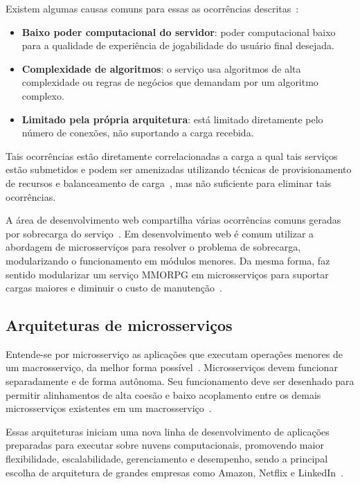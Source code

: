 Existem algumas causas comuns para essas as ocorrências descritas~\cite{1417630}:

\begin{itemize}
  \item \textbf{Baixo poder computacional do servidor}: poder computacional baixo para a qualidade de experiência de jogabilidade do usuário final desejada.
  \item \textbf{Complexidade de algoritmos}: o serviço usa algoritmos de alta complexidade ou regras de negócios que demandam por um algoritmo complexo.
  \item \textbf{Limitado pela própria arquitetura}: está limitado diretamente pelo número de conexões, não suportando a carga recebida.
\end{itemize}

Tais ocorrências estão diretamente correlacionadas a carga a qual tais serviços estão submetidos e podem ser amenizadas utilizando técnicas de provisionamento de recursos e balanceamento de carga~\cite{1417630}, mas não suficiente para eliminar tais ocorrências.

A área de desenvolvimento web compartilha várias ocorrências comuns geradas por sobrecarga do serviço~\cite{7830692}.
%
Em desenvolvimento web é comum utilizar a abordagem de microsserviços para resolver o problema de sobrecarga, modularizando o  funcionamento em módulos menores.
%
Da mesma forma, faz sentido modularizar um serviço \ac{MMORPG} em microsserviços para suportar cargas maiores e diminuir o custo de manutenção~\cite{7515686}.

\subsection{Arquiteturas de microsserviços}

Entende-se por microsserviço as aplicações que executam operações menores de um macrosserviço, da melhor forma possível~\cite{stephenclarkewillson2017}.
%
Microsserviços devem funcionar separadamente e de forma autônoma.
%
Seu funcionamento deve ser desenhado para permitir alinhamentos de alta coesão e baixo acoplamento entre os demais microsserviços existentes em um macrosserviço~\cite{8169955}.



Essas arquiteturas iniciam uma nova linha de desenvolvimento de aplicações preparadas para executar sobre nuvens computacionais, promovendo maior flexibilidade, escalabilidade, gerenciamento e desempenho, sendo a principal escolha de arquitetura de grandes empresas como Amazon, Netflix e LinkedIn~\cite{7830692,7515686}.

